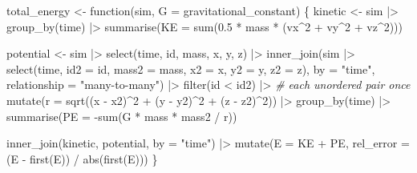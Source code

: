 \documentclass[
  10.5pt,
  letterpaper,
]{scrbook}
\newenvironment{Shaded}{\begin{snugshade}}{\end{snugshade}}
\newcommand{\AttributeTok}[1]{\textcolor[rgb]{0.00,0.00,0.00}{#1}}
\newcommand{\CommentTok}[1]{\textcolor[rgb]{0.00,0.00,0.00}{\textit{#1}}}
\newcommand{\ControlFlowTok}[1]{\textcolor[rgb]{0.00,0.00,0.00}{#1}}
\newcommand{\DecValTok}[1]{\textcolor[rgb]{0.00,0.00,0.00}{#1}}
\newcommand{\FloatTok}[1]{\textcolor[rgb]{0.00,0.00,0.00}{#1}}
\newcommand{\FunctionTok}[1]{\textcolor[rgb]{0.00,0.00,0.00}{#1}}
\newcommand{\NormalTok}[1]{\textcolor[rgb]{0.00,0.00,0.00}{#1}}
\newcommand{\OtherTok}[1]{\textcolor[rgb]{0.00,0.00,0.00}{#1}}
\newcommand{\SpecialCharTok}[1]{\textcolor[rgb]{0.00,0.00,0.00}{#1}}
\newcommand{\StringTok}[1]{\textcolor[rgb]{0.00,0.00,0.00}{#1}}
\theoremstyle{definition}
\theoremstyle{plain}
\theoremstyle{remark}
\begin{document}
\begin{Shaded}
\begin{Highlighting}[]
\NormalTok{total\_energy }\OtherTok{\textless{}{-}} \ControlFlowTok{function}\NormalTok{(sim, }\AttributeTok{G =}\NormalTok{ gravitational\_constant) \{}
\NormalTok{  kinetic }\OtherTok{\textless{}{-}}\NormalTok{ sim }\SpecialCharTok{|\textgreater{}}
    \FunctionTok{group\_by}\NormalTok{(time) }\SpecialCharTok{|\textgreater{}}
    \FunctionTok{summarise}\NormalTok{(}\AttributeTok{KE =} \FunctionTok{sum}\NormalTok{(}\FloatTok{0.5} \SpecialCharTok{*}\NormalTok{ mass }\SpecialCharTok{*}\NormalTok{ (vx}\SpecialCharTok{\^{}}\DecValTok{2} \SpecialCharTok{+}\NormalTok{ vy}\SpecialCharTok{\^{}}\DecValTok{2} \SpecialCharTok{+}\NormalTok{ vz}\SpecialCharTok{\^{}}\DecValTok{2}\NormalTok{)))}

\NormalTok{  potential }\OtherTok{\textless{}{-}}\NormalTok{ sim }\SpecialCharTok{|\textgreater{}}
    \FunctionTok{select}\NormalTok{(time, id, mass, x, y, z) }\SpecialCharTok{|\textgreater{}}
    \FunctionTok{inner\_join}\NormalTok{(sim }\SpecialCharTok{|\textgreater{}} \FunctionTok{select}\NormalTok{(time, }\AttributeTok{id2 =}\NormalTok{ id, }\AttributeTok{mass2 =}\NormalTok{ mass,}
                             \AttributeTok{x2 =}\NormalTok{ x, }\AttributeTok{y2 =}\NormalTok{ y, }\AttributeTok{z2 =}\NormalTok{ z),}
               \AttributeTok{by =} \StringTok{"time"}\NormalTok{, }\AttributeTok{relationship =} \StringTok{"many{-}to{-}many"}\NormalTok{) }\SpecialCharTok{|\textgreater{}}
    \FunctionTok{filter}\NormalTok{(id }\SpecialCharTok{\textless{}}\NormalTok{ id2) }\SpecialCharTok{|\textgreater{}}                       \CommentTok{\# each unordered pair once}
    \FunctionTok{mutate}\NormalTok{(}\AttributeTok{r =} \FunctionTok{sqrt}\NormalTok{((x }\SpecialCharTok{{-}}\NormalTok{ x2)}\SpecialCharTok{\^{}}\DecValTok{2} \SpecialCharTok{+}\NormalTok{ (y }\SpecialCharTok{{-}}\NormalTok{ y2)}\SpecialCharTok{\^{}}\DecValTok{2} \SpecialCharTok{+}\NormalTok{ (z }\SpecialCharTok{{-}}\NormalTok{ z2)}\SpecialCharTok{\^{}}\DecValTok{2}\NormalTok{)) }\SpecialCharTok{|\textgreater{}}
    \FunctionTok{group\_by}\NormalTok{(time) }\SpecialCharTok{|\textgreater{}}
    \FunctionTok{summarise}\NormalTok{(}\AttributeTok{PE =} \SpecialCharTok{{-}}\FunctionTok{sum}\NormalTok{(G }\SpecialCharTok{*}\NormalTok{ mass }\SpecialCharTok{*}\NormalTok{ mass2 }\SpecialCharTok{/}\NormalTok{ r))}

  \FunctionTok{inner\_join}\NormalTok{(kinetic, potential, }\AttributeTok{by =} \StringTok{"time"}\NormalTok{) }\SpecialCharTok{|\textgreater{}}
    \FunctionTok{mutate}\NormalTok{(}\AttributeTok{E =}\NormalTok{ KE }\SpecialCharTok{+}\NormalTok{ PE,}
           \AttributeTok{rel\_error =}\NormalTok{ (E }\SpecialCharTok{{-}} \FunctionTok{first}\NormalTok{(E)) }\SpecialCharTok{/} \FunctionTok{abs}\NormalTok{(}\FunctionTok{first}\NormalTok{(E)))}
\NormalTok{\}}
\end{Highlighting}
\end{Shaded}
\end{document}
